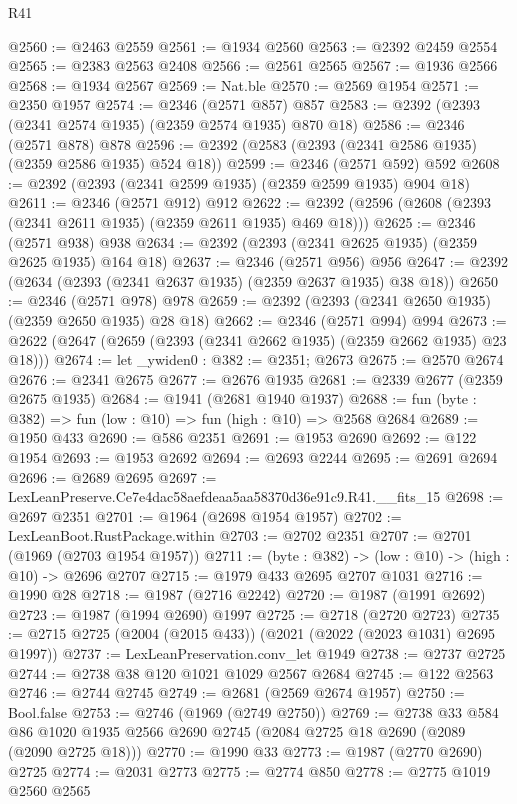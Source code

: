 \begin{lexlean}{R41}
\begin{coremodule}
@2560 := @2463 @2559
@2561 := @1934 @2560
@2563 := @2392 @2459 @2554
@2565 := @2383 @2563 @2408
@2566 := @2561 @2565
@2567 := @1936 @2566
@2568 := @1934 @2567
@2569 := Nat.ble
@2570 := @2569 @1954
@2571 := @2350 @1957
@2574 := @2346 (@2571 @857) @857
@2583 := @2392 (@2393 (@2341 @2574 @1935) (@2359 @2574 @1935) @870 @18)
@2586 := @2346 (@2571 @878) @878
@2596 := @2392 (@2583 (@2393 (@2341 @2586 @1935) (@2359 @2586 @1935) @524 @18))
@2599 := @2346 (@2571 @592) @592
@2608 := @2392 (@2393 (@2341 @2599 @1935) (@2359 @2599 @1935) @904 @18)
@2611 := @2346 (@2571 @912) @912
@2622 := @2392 (@2596 (@2608 (@2393 (@2341 @2611 @1935) (@2359 @2611 @1935) @469 @18)))
@2625 := @2346 (@2571 @938) @938
@2634 := @2392 (@2393 (@2341 @2625 @1935) (@2359 @2625 @1935) @164 @18)
@2637 := @2346 (@2571 @956) @956
@2647 := @2392 (@2634 (@2393 (@2341 @2637 @1935) (@2359 @2637 @1935) @38 @18))
@2650 := @2346 (@2571 @978) @978
@2659 := @2392 (@2393 (@2341 @2650 @1935) (@2359 @2650 @1935) @28 @18)
@2662 := @2346 (@2571 @994) @994
@2673 := @2622 (@2647 (@2659 (@2393 (@2341 @2662 @1935) (@2359 @2662 @1935) @23 @18)))
@2674 := let _ywiden0 : @382 := @2351; @2673
@2675 := @2570 @2674
@2676 := @2341 @2675
@2677 := @2676 @1935
@2681 := @2339 @2677 (@2359 @2675 @1935)
@2684 := @1941 (@2681 @1940 @1937)
@2688 := fun (byte : @382) => fun (low : @10) => fun (high : @10) => @2568 @2684
@2689 := @1950 @433
@2690 := @586 @2351
@2691 := @1953 @2690
@2692 := @122 @1954
@2693 := @1953 @2692
@2694 := @2693 @2244
@2695 := @2691 @2694
@2696 := @2689 @2695
@2697 := LexLeanPreserve.Ce7e4dac58aefdeaa5aa58370d36e91c9.R41.__fits_15
@2698 := @2697 @2351
@2701 := @1964 (@2698 @1954 @1957)
@2702 := LexLeanBoot.RustPackage.within
@2703 := @2702 @2351
@2707 := @2701 (@1969 (@2703 @1954 @1957))
@2711 := (byte : @382) -> (low : @10) -> (high : @10) -> @2696 @2707
@2715 := @1979 @433 @2695 @2707 @1031
@2716 := @1990 @28
@2718 := @1987 (@2716 @2242)
@2720 := @1987 (@1991 @2692)
@2723 := @1987 (@1994 @2690) @1997
@2725 := @2718 (@2720 @2723)
@2735 := @2715 @2725 (@2004 (@2015 @433)) (@2021 (@2022 (@2023 @1031) @2695 @1997))
@2737 := LexLeanPreservation.conv_let @1949
@2738 := @2737 @2725
@2744 := @2738 @38 @120 @1021 @1029 @2567 @2684
@2745 := @122 @2563
@2746 := @2744 @2745
@2749 := @2681 (@2569 @2674 @1957)
@2750 := Bool.false
@2753 := @2746 (@1969 (@2749 @2750))
@2769 := @2738
    @33
    @584
    @86
    @1020
    @1935
    @2566
    @2690
    @2745
    (@2084 @2725 @18 @2690 (@2089 (@2090 @2725 @18)))
@2770 := @1990 @33
@2773 := @1987 (@2770 @2690) @2725
@2774 := @2031 @2773
@2775 := @2774 @850
@2778 := @2775 @1019 @2560 @2565

\end{coremodule}
\end{lexlean}
